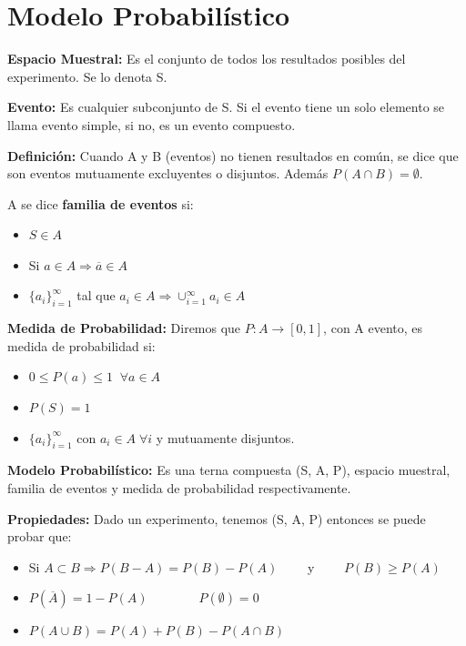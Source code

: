 \documentclass[12pt,a4paper]{report}
\begin{document}
	\section{Modelo Probabilístico}
		\par \textbf{Espacio Muestral:} Es el conjunto de todos los resultados posibles del experimento. Se lo denota S.
		\vspace{3mm}
		\par \textbf{Evento:} Es cualquier subconjunto de S. Si el evento tiene un solo elemento se llama evento simple, si no, es un evento compuesto.
		\vspace{3mm}
		\par \textbf{Definición:} Cuando A y B (eventos) no tienen resultados en común, se dice que son eventos mutuamente excluyentes o disjuntos. Además $P(A \cap B) = \emptyset$.
		\vspace{3mm}
		\par A se dice \textbf{familia de eventos} si:
		\begin{itemize}
			\item $S \in A$
			\item Si $a \in A \Rightarrow \overline{a} \in A$
			\item $\lbrace a_{i} \rbrace_{i=1}^{\infty}$ tal que $a_{i} \in A \Rightarrow \cup_{i=1}^{\infty} a_{i} \in A$
		\end{itemize}
		
		\vspace{3mm}
		\par \textbf{Medida de Probabilidad:} Diremos que $P: A \rightarrow \left[0, 1\right]$, con A evento, es medida de probabilidad si:
		\begin{itemize}
			\item $0 \leq P(a) \leq 1 \;\; \forall a \in A$
			\item $P(S) = 1$
			\item $\lbrace a_{i} \rbrace_{i=1}^{\infty}$ con $a_{i} \in A \; \forall i$ y mutuamente disjuntos.	
		\end{itemize}
		
		\vspace{3mm}
		\par \textbf{Modelo Probabilístico:} Es una terna compuesta (S, A, P), espacio muestral, familia de eventos y medida de probabilidad respectivamente.
		
		\vspace{3mm}
		\par \textbf{Propiedades:} Dado un experimento, tenemos (S, A, P) entonces se puede probar que:
		\begin{itemize}
			\item Si $A \subset B \Rightarrow P(B - A) = P(B) - P(A) \qquad$ y $\qquad P(B) \geq P(A)$
			\item $P(\overline{A}) = 1 - P(A) \qquad\qquad P(\emptyset) = 0$
			\item $P(A \cup B) = P(A) + P(B) - P(A \cap B)$
		\end{itemize}
		
\end{document}
